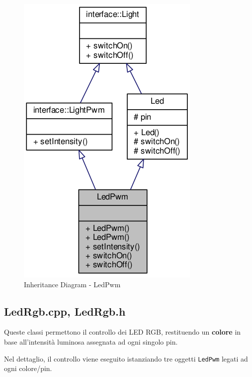 \begin{figure}[!ht]
	\centering
	\includegraphics[scale=.4]{img/UML/InheritanceDiagram/LedPwm.png}
	\caption{Inheritance Diagram - LedPwm}
\end{figure}

\newpage
\subsection{LedRgb.cpp, LedRgb.h}
Queste classi permettono il controllo dei LED RGB, restituendo un \textbf{colore} in base all'intensità luminosa assegnata ad ogni singolo pin.

Nel dettaglio, il controllo viene eseguito istanziando tre oggetti \texttt{LedPwm} legati ad ogni colore/pin.
